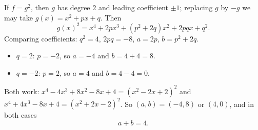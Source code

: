 If $f=g^2$, then $g$ has degree $2$ and leading coefficient $\pm1$; replacing $g$ by $-g$ we may take $g(x)=x^2+px+q$. Then
\[g(x)^2=x^4+2px^3+\left(p^2+2q\right)x^2+2pqx+q^2.\]
Comparing coefficients: $q^2=4$, $2pq=-8$, $a=2p$, $b=p^2+2q$.
\begin{itemize}
\item $q=2$: $p=-2$, so $a=-4$ and $b=4+4=8$.
\item $q=-2$: $p=2$, so $a=4$ and $b=4-4=0$.
\end{itemize}
Both work: $x^4-4x^3+8x^2-8x+4=\left(x^2-2x+2\right)^2$ and $x^4+4x^3-8x+4=\left(x^2+2x-2\right)^2$. So $(a,b)=(-4,8)$ or $(4,0)$, and in both cases
\[a+b=\boxed{4}.\]
